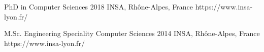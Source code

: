 \schooldiploma
{PhD in Computer Sciences}
{}
{2018}
{INSA, Rhône-Alpes, France}
{https://www.insa-lyon.fr/}

\schooldiploma
{M.Sc. Engineering}
{Speciality Computer Sciences}
{2014}
{INSA, Rhône-Alpes, France}
{https://www.insa-lyon.fr/}
